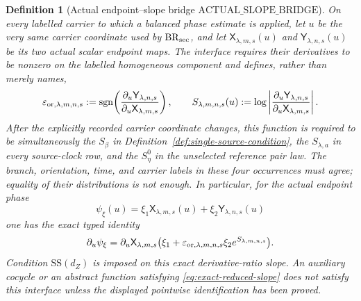 \documentclass[11pt]{article}
\newtheorem{definition}[theorem]{Definition}
\begin{document}
\begin{definition}[Actual endpoint--slope bridge
$\mathrm{ACTUAL\_SLOPE\_BRIDGE}$]
\label{def:actual-slope-bridge}
On every labelled carrier to which a balanced phase estimate is applied,
let $u$ be the very same carrier coordinate used by
$\mathrm{BR}_{\rm sec}$, and let
$\mathsf X_{\lambda,m,s}(u)$ and
$\mathsf Y_{\lambda,n,s}(u)$ be its two actual scalar endpoint maps.  The
interface requires their derivatives to be nonzero on the labelled
homogeneous component and defines, rather than merely names,
\begin{equation}
\label{eq:actual-derivative-ratio-slope}
 \varepsilon_{{\rm or},\lambda,m,n,s}
 :=\operatorname{sgn}\!\left(
   \frac{\partial_u\mathsf Y_{\lambda,n,s}}
        {\partial_u\mathsf X_{\lambda,m,s}}\right),
 \qquad
 S_{\lambda,m,n,s}(u)
 :=\log\left|
   \frac{\partial_u\mathsf Y_{\lambda,n,s}}
        {\partial_u\mathsf X_{\lambda,m,s}}\right|.
\end{equation}
After the explicitly recorded carrier coordinate changes, this function is
required to be simultaneously the $S_\beta$ in
Definition~\ref{def:single-source-condition}, the $S_{\lambda,a}$ in every
source-clock row, and the $S^0_\eta$ in the unselected reference pair law.
The branch, orientation, time, and carrier labels in these four occurrences
must agree; equality of their distributions is not enough.  In particular,
for the actual endpoint phase
\begin{equation}
\label{eq:actual-balanced-phase-identity}
 \psi_\xi(u)=\xi_1\mathsf X_{\lambda,m,s}(u)
             +\xi_2\mathsf Y_{\lambda,n,s}(u)
\end{equation}
one has the exact typed identity
\begin{equation}
\label{eq:actual-balanced-phase-derivative}
 \partial_u\psi_\xi
 =\partial_u\mathsf X_{\lambda,m,s}
  \bigl(\xi_1+\varepsilon_{{\rm or},\lambda,m,n,s}
                   \xi_2e^{S_{\lambda,m,n,s}}\bigr).
\end{equation}
Condition $\mathrm{SS}(d_Z)$ is imposed on this exact derivative-ratio
slope.  An auxiliary cocycle or an abstract function satisfying
\eqref{eq:exact-reduced-slope} does not satisfy this interface unless the
displayed pointwise identification has been proved.
\end{definition}
\end{document}
